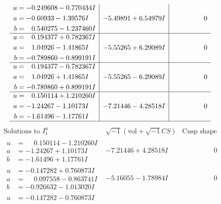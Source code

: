 \documentclass[1p]{elsarticle_modified}
\theoremstyle{definition}
\newcommand{\I}{\sqrt{-1}}
\begin{document}
$$\begin{array}{c|c|c}
\begin{aligned}
u &= -0.249608 - 0.770434 I \\
a &= -0.60933 - 1.39576 I \\
b &= \phantom{-}0.540275 - 1.237460 I\end{aligned}
 & -5.49891 + 6.54979 I & \phantom{-0.000000 } 0 \\ \hline\begin{aligned}
u &= \phantom{-}0.194377 + 0.782367 I \\
a &= \phantom{-}1.04926 - 1.41865 I \\
b &= -0.789860 - 0.899191 I\end{aligned}
 & -5.55265 + 6.29089 I & \phantom{-0.000000 } 0 \\ \hline\begin{aligned}
u &= \phantom{-}0.194377 - 0.782367 I \\
a &= \phantom{-}1.04926 + 1.41865 I \\
b &= -0.789860 + 0.899191 I\end{aligned}
 & -5.55265 - 6.29089 I & \phantom{-0.000000 } 0 \\ \hline\begin{aligned}
u &= \phantom{-}0.150114 + 1.210260 I \\
a &= -1.24267 - 1.10173 I \\
b &= -1.61496 - 1.17761 I\end{aligned}
 & -7.21446 - 4.28518 I & \phantom{-0.000000 } 0\\
 \hline 
 \end{array}$$\newpage$$\begin{array}{c|c|c}  
\text{Solutions to }I^u_{1}& \I (\text{vol} + \sqrt{-1}CS) & \text{Cusp shape}\\
 \hline 
\begin{aligned}
u &= \phantom{-}0.150114 - 1.210260 I \\
a &= -1.24267 + 1.10173 I \\
b &= -1.61496 + 1.17761 I\end{aligned}
 & -7.21446 + 4.28518 I & \phantom{-0.000000 } 0 \\ \hline\begin{aligned}
u &= -0.147282 + 0.760873 I \\
a &= \phantom{-}0.097558 - 0.863741 I \\
b &= -0.926632 - 1.013020 I\end{aligned}
 & -5.16055 - 1.78984 I & \phantom{-0.000000 } 0 \\ \hline\begin{aligned}
u &= -0.147282 - 0.760873 I \\

\end{aligned}
\end{array}$$
\end{document}
